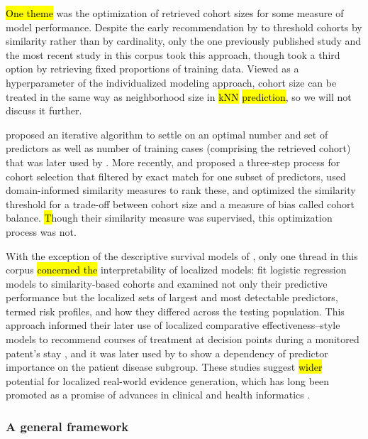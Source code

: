 \documentclass[sn-mathphys,Numbered,pdflatex]{sn-jnl}
\theoremstyle{remark}
\theoremstyle{definition}
\begin{document}
\hl{One theme} was the optimization of retrieved cohort sizes for some
measure of model performance. Despite the early recommendation by
\citet{Park2006} to threshold cohorts by similarity rather than by
cardinality, only the one previously published study
\citep{Mariuzzi1997} and the most recent study \citep{Tang2021, Ng2021}
in this corpus took this approach, though \citet{Liu2022} took a third
option by retrieving fixed proportions of training data. Viewed as a
hyperparameter of the individualized modeling approach, cohort size can
be treated in the same way as neighborhood size in \hl{kNN}
\hl{prediction}, so we will not discuss it further.

\citet{Kasabov2010} proposed an iterative algorithm to settle on an
optimal number and set of predictors as well as number of training cases
(comprising the retrieved cohort) that was later used by
\citet{Liang2015}. More recently, \citet{Tang2021} and \citet{Ng2021}
proposed a three-step process for cohort selection that filtered by
exact match for one subset of predictors, used domain-informed
similarity measures to rank these, and optimized the similarity
threshold for a trade-off between cohort size and a measure of bias
called cohort balance. \hl{T}hough their similarity measure was
supervised, this optimization process was not.

With the exception of the descriptive survival models of
\citet{Mariuzzi1997}, only one thread in this corpus \hl{concerned the}
interpretability of localized models: \citet{Ng2015} fit logistic
regression models to similarity-based cohorts and examined not only
their predictive performance but the localized sets of largest and most
detectable predictors, termed risk profiles, and how they differed
across the testing population. This approach informed their later use of
localized comparative effectiveness--style models to recommend courses
of treatment at decision points during a monitored patent's stay
\citep{Tang2021, Ng2021}, and it was later used by \citet{Liu2022} to
show a dependency of predictor importance on the patient disease
subgroup. These studies suggest \hl{wider} potential for localized
real-world evidence generation, which has long been promoted as a
promise of advances in clinical and health informatics
\citep{Longhurst2014}.

\subsubsection{A general framework}\label{a-general-framework}
\end{document}

